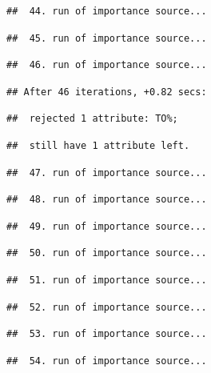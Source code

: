 \documentclass[
]{article}
\begin{document}
\begin{verbatim}
##  44. run of importance source...
\end{verbatim}

\begin{verbatim}
##  45. run of importance source...
\end{verbatim}

\begin{verbatim}
##  46. run of importance source...
\end{verbatim}

\begin{verbatim}
## After 46 iterations, +0.82 secs:
\end{verbatim}

\begin{verbatim}
##  rejected 1 attribute: TO%;
\end{verbatim}

\begin{verbatim}
##  still have 1 attribute left.
\end{verbatim}

\begin{verbatim}
##  47. run of importance source...
\end{verbatim}

\begin{verbatim}
##  48. run of importance source...
\end{verbatim}

\begin{verbatim}
##  49. run of importance source...
\end{verbatim}

\begin{verbatim}
##  50. run of importance source...
\end{verbatim}

\begin{verbatim}
##  51. run of importance source...
\end{verbatim}

\begin{verbatim}
##  52. run of importance source...
\end{verbatim}

\begin{verbatim}
##  53. run of importance source...
\end{verbatim}

\begin{verbatim}
##  54. run of importance source...
\end{verbatim}
\end{document}
